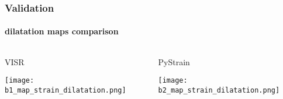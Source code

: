 \begin{frame}
  \frametitle{Validation}
  \framesubtitle{dilatation maps comparison}
  \label{ch3:data}
  
  \begin{columns}
    \begin{column}{0.5\textwidth}
      VISR
      
      \texttt{[image: b1\_map\_strain\_dilatation.png]}   
    \end{column}
    \begin{column}{0.5\textwidth}
    \begin{center}
      PyStrain
      
      \texttt{[image: b2\_map\_strain\_dilatation.png]}     
    \end{center}
    \end{column}
  \end{columns}

\end{frame}
\note{}




